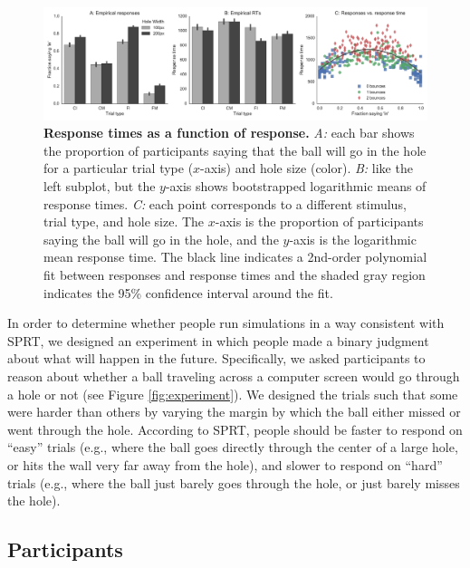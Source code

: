 \documentclass[10pt,letterpaper]{article}
\begin{document}
\begin{figure}[t]
    \begin{center}
        \includegraphics[width=\textwidth]{figures/hole_empirical_results.pdf}
        \caption{\textbf{Response times as a function of response.} \emph{A:} each bar shows the proportion of participants saying that the ball will go in the hole for a particular trial type ($x$-axis) and hole size (color). \emph{B:} like the left subplot, but the $y$-axis shows bootstrapped logarithmic means of response times. \emph{C:} each point corresponds to a different stimulus, trial type, and hole size.  The $x$-axis is the proportion of participants saying the ball will go in the hole, and the $y$-axis is the logarithmic mean response time. The black line indicates a 2nd-order polynomial fit between responses and response times and the shaded gray region indicates the 95\% confidence interval around the fit.}
        \label{fig:pct-vs-rt}
    \end{center}
\end{figure}

In order to determine whether people run simulations in a way consistent with SPRT, we designed an experiment in which people made a binary judgment about what will happen in the future.
Specifically, we asked participants to reason about whether a ball traveling across a computer screen would go through a hole or not (see Figure \ref{fig:experiment}).
We designed the trials such that some were harder than others by varying the margin by which the ball either missed or went through the hole.
According to SPRT, people should be faster to respond on ``easy'' trials (e.g., where the ball goes directly through the center of a large hole, or hits the wall very far away from the hole), and slower to respond on ``hard'' trials (e.g., where the ball just barely goes through the hole, or just barely misses the hole).

\subsection{Participants}
\end{document}
